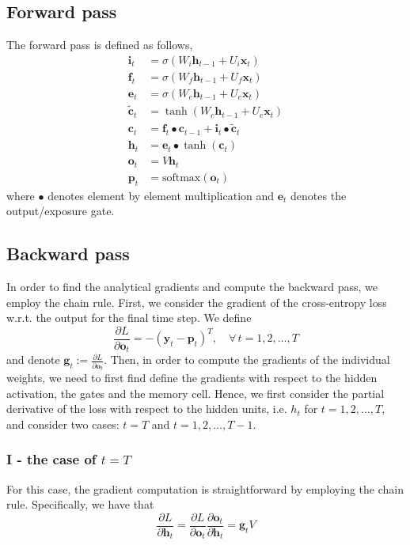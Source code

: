 \documentclass{article}
\begin{document}
\subsection*{Forward pass}
	The forward pass is defined as follows, 
	\begin{align*}
		\bm{i}_t &= \sigma(W_i \bm{h}_{t-1} + U_i\bm{x}_t) \\
		\bm{f}_t &= \sigma(W_f \bm{h}_{t-1} + U_f\bm{x}_t) \\
		\bm{e}_t &= \sigma(W_e \bm{h}_{t-1} + U_e\bm{x}_t) \\
		\tilde{\bm{c}}_t &= \tanh(W_c\bm{h}_{t-1} + U_c\bm{x}_t) \\
		\bm{c}_t &= \bm{f}_t \bullet \bm{c}_{t-1} + \bm{i}_t \bullet \tilde{\bm{c}}_t \\
		\bm{h}_t &= \bm{e}_t \bullet \tanh(\bm{c}_t)\\
		\bm{o}_t &= V \bm{h}_t \\
		\bm{p}_t &= \text{softmax}(\bm{o}_t)
	\end{align*}
	where $\bullet$ denotes element by element multiplication and $\bm{e}_t$ denotes the output/exposure gate. 

\subsection*{Backward pass}
	In order to find the analytical gradients and compute the backward pass, we employ the chain rule. First, we consider the gradient of the cross-entropy loss w.r.t. the output for the final time step. We define 
	$$\frac{\partial L}{\partial \bm{o}_t} = -(\bm{y}_t - \bm{p}_t)^T, \quad \forall\, t = 1, 2, \dots, T$$
	and denote $\bm{g}_t := \frac{\partial L}{\partial \bm{o}_t}$. Then, in order to compute the gradients of the individual weights, we need to first find define the gradients with respect to the hidden activation, the gates and the memory cell. Hence, we  first consider the partial derivative of the loss with respect to the hidden units, i.e. $h_t$ for $t = 1, 2, \dots, T$, and consider two cases: $t= T$ and $t = 1, 2, \dots, T-1$. 

\subsubsection*{I - the case of $t = T$}
	For this case, the gradient computation is straightforward by employing the chain rule. Specifically, we have that
	$$\frac{\partial L}{\partial \bm{h}_t} = \frac{\partial L}{\partial \bm{o}_t} \frac{\partial\bm{o}_t}{\partial \bm{h}_t} = \bm{g}_t V$$ 
\end{document}
